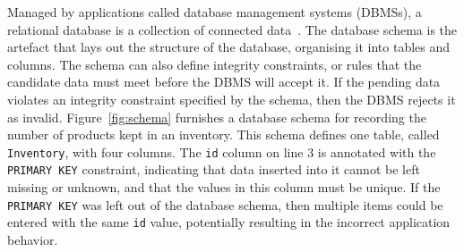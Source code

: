 



Managed by applications called database management systems (DBMSs), a relational database is a collection of connected
data~\cite{databasebook}. The database schema is the artefact that lays out the structure of the database, organising it
into tables and columns.  The schema can also define integrity constraints, or rules that the candidate data must meet
before the DBMS will accept it. If the pending data violates an integrity constraint specified by the schema, then the
DBMS rejects it as invalid.  Figure~\ref{fig:schema} furnishes a database schema for recording the number of products
kept in an inventory. This schema defines one table, called \texttt{Inventory}, with four columns.  The \texttt{id}
column on line $3$ is annotated with the \texttt{PRIMARY KEY} constraint, indicating that data inserted into it cannot
be left missing or unknown, and that the values in this column must be unique. If the \texttt{PRIMARY KEY} was left out
of the database schema, then multiple items could be entered with the same \texttt{id} value, potentially resulting in
the incorrect application behavior.


